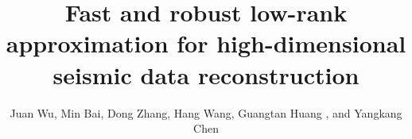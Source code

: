
\title{Fast and robust low-rank approximation for high-dimensional seismic data reconstruction}



\author{Juan Wu\footnotemark[1], Min Bai\footnotemark[1], Dong Zhang\footnotemark[2], Hang Wang\footnotemark[3], Guangtan Huang \footnotemark[3], and Yangkang Chen\footnotemark[3] }

\address{
\footnotemark[1]Key Laboratory of Exploration Technology for Oil and Gas Resources of Ministry of Education\\
Yangtze University\\
Wuhan 430100, China\\
\footnotemark[2] Faculty of Applied Sciences \\
Delft University of Technology \\
Lorentzweg 1, Delft, Netherlands, 2628CJ  \\
\footnotemark[3] School of Earth Sciences \\
Zhejiang University \\
Hangzhou, Zhejiang, 310027 \\
}



\def\thevol{8}
\def\myyear{2020}

